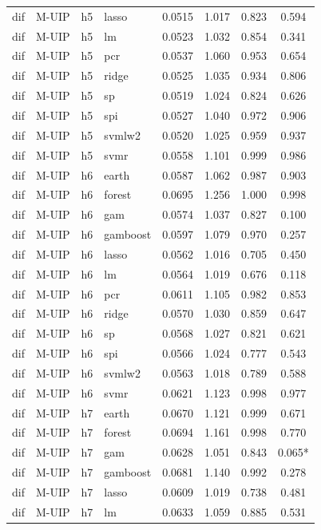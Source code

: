 \begin{ThreePartTable}
\begin{longtable}[t]{llclcccc}
dif & M-UIP & h5 & lasso & 0.0515 & 1.017 & 0.823 & 0.594\\
dif & M-UIP & h5 & lm & 0.0523 & 1.032 & 0.854 & 0.341\\
dif & M-UIP & h5 & pcr & 0.0537 & 1.060 & 0.953 & 0.654\\
dif & M-UIP & h5 & ridge & 0.0525 & 1.035 & 0.934 & 0.806\\
dif & M-UIP & h5 & sp & 0.0519 & 1.024 & 0.824 & 0.626\\
dif & M-UIP & h5 & spi & 0.0527 & 1.040 & 0.972 & 0.906\\
dif & M-UIP & h5 & svmlw2 & 0.0520 & 1.025 & 0.959 & 0.937\\
dif & M-UIP & h5 & svmr & 0.0558 & 1.101 & 0.999 & 0.986\\
\addlinespace
dif & M-UIP & h6 & earth & 0.0587 & 1.062 & 0.987 & 0.903\\
dif & M-UIP & h6 & forest & 0.0695 & 1.256 & 1.000 & 0.998\\
dif & M-UIP & h6 & gam & 0.0574 & 1.037 & 0.827 & 0.100\\
dif & M-UIP & h6 & gamboost & 0.0597 & 1.079 & 0.970 & 0.257\\
dif & M-UIP & h6 & lasso & 0.0562 & 1.016 & 0.705 & 0.450\\
dif & M-UIP & h6 & lm & 0.0564 & 1.019 & 0.676 & 0.118\\
dif & M-UIP & h6 & pcr & 0.0611 & 1.105 & 0.982 & 0.853\\
dif & M-UIP & h6 & ridge & 0.0570 & 1.030 & 0.859 & 0.647\\
dif & M-UIP & h6 & sp & 0.0568 & 1.027 & 0.821 & 0.621\\
dif & M-UIP & h6 & spi & 0.0566 & 1.024 & 0.777 & 0.543\\
dif & M-UIP & h6 & svmlw2 & 0.0563 & 1.018 & 0.789 & 0.588\\
dif & M-UIP & h6 & svmr & 0.0621 & 1.123 & 0.998 & 0.977\\
\addlinespace
dif & M-UIP & h7 & earth & 0.0670 & 1.121 & 0.999 & 0.671\\
dif & M-UIP & h7 & forest & 0.0694 & 1.161 & 0.998 & 0.770\\
dif & M-UIP & h7 & gam & 0.0628 & 1.051 & 0.843 & 0.065*\\
dif & M-UIP & h7 & gamboost & 0.0681 & 1.140 & 0.992 & 0.278\\
dif & M-UIP & h7 & lasso & 0.0609 & 1.019 & 0.738 & 0.481\\
dif & M-UIP & h7 & lm & 0.0633 & 1.059 & 0.885 & 0.531\\

\end{longtable}
\end{ThreePartTable}
